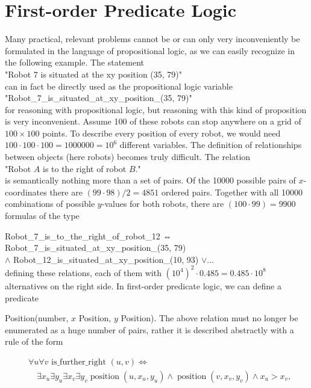 \documentclass[10pt]{book}
\begin{document}
\section*{First-order Predicate Logic}
Many practical, relevant problems cannot be or can only very inconveniently be formulated in the language of propositional logic, as we can easily recognize in the following example. The statement\\

"Robot 7 is situated at the xy position (35, 79)"\\
can in fact be directly used as the propositional logic variable\\
"Robot\_7\_is\_situated\_at\_xy\_position\_(35, 79)"\\
for reasoning with propositional logic, but reasoning with this kind of proposition is very inconvenient. Assume 100 of these robots can stop anywhere on a grid of $100 \times 100$ points. To describe every position of every robot, we would need $100 \cdot 100 \cdot 100=1000000=10^{6}$ different variables. The definition of relationships between objects (here robots) becomes truly difficult. The relation\\
"Robot $A$ is to the right of robot $B$."\\
is semantically nothing more than a set of pairs. Of the 10000 possible pairs of $x$-coordinates there are $(99 \cdot 98) / 2=4851$ ordered pairs. Together with all 10000 combinations of possible $y$-values for both robots, there are $(100 \cdot 99)=9900$ formulas of the type

Robot\_7\_is\_to\_the\_right\_of\_robot\_12 ⇔\\
Robot\_7\_is\_situated\_at\_xy\_position\_(35, 79)\\
$\wedge$ Robot\_12\_is\_situated\_at\_xy\_position\_(10, 93) $\vee \ldots$\\
defining these relations, each of them with $\left(10^{4}\right)^{2} \cdot 0.485=0.485 \cdot 10^{8}$ alternatives on the right side. In first-order predicate logic, we can define a predicate

Position(number, $x$ Position, $y$ Position). The above relation must no longer be enumerated as a huge number of pairs, rather it is described abstractly with a rule of the form

$$
\begin{aligned}
& \forall u \forall v \text { is_further_right }(u, v) \Leftrightarrow \\
& \quad \exists x_{u} \exists y_{u} \exists x_{v} \exists y_{v} \operatorname{position}\left(u, x_{u}, y_{u}\right) \wedge \operatorname{position}\left(v, x_{v}, y_{v}\right) \wedge x_{u}>x_{v},
\end{aligned}
$$
\end{document}
